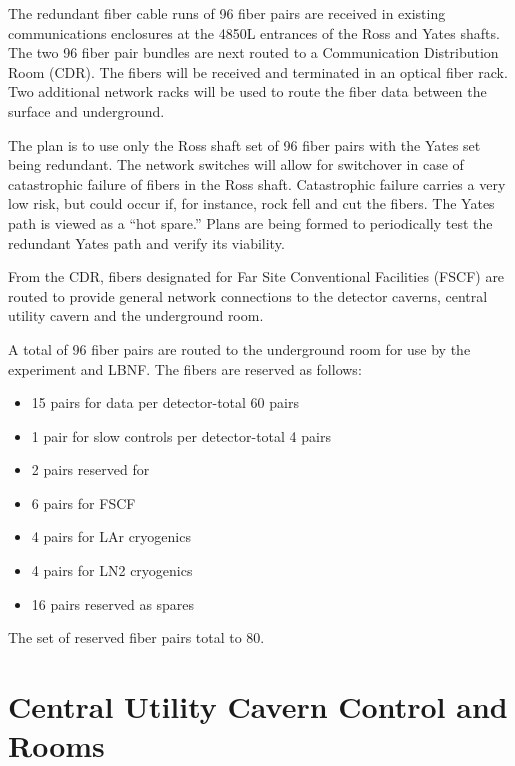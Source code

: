 The redundant fiber cable runs of 96 fiber pairs are received in
existing communications enclosures at the 4850L entrances of the Ross
and Yates shafts.  The two 96 fiber pair bundles are next routed to a
Communication Distribution Room (CDR).  The fibers will be received
and terminated in an optical fiber rack. Two additional network racks
will be used to route the fiber data between the surface and
underground.

The plan is to use only the Ross shaft set of 96 fiber pairs with the
Yates set being redundant.  The network switches will allow for
switchover in case of catastrophic failure of fibers in the Ross
shaft. Catastrophic failure carries a very low risk, but could occur
if, for instance, rock fell and cut the fibers.  The Yates path is
viewed as a “hot spare.” Plans are being formed to periodically test
the redundant Yates path and verify its viability.

From the CDR, fibers designated for Far Site Conventional Facilities
(FSCF) are routed to provide general network connections to the
detector caverns, central utility cavern and the underground  room.

A total of 96 fiber pairs are routed to the underground  room for
use by the  experiment and LBNF. The fibers are reserved as
follows:
\begin{itemize}
  \item 15 pairs for  data per detector-total 60 pairs
\item 1 pair for slow controls per detector-total 4 pairs
\item 2 pairs reserved for 
\item 6 pairs for FSCF
\item 4 pairs for LAr cryogenics
\item 4 pairs for LN2 cryogenics
  \item 16 pairs reserved as spares
\end{itemize}
The set of reserved fiber pairs total to 80.



\section{Central Utility Cavern Control and  Rooms}
\label{sec:fdsp-coord-cuc-daq}

